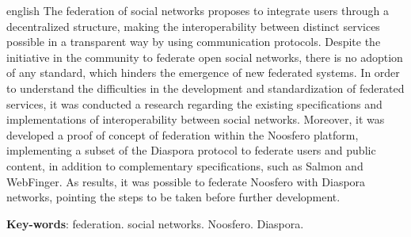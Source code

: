 \begin{resumo}[Abstract]
  \begin{otherlanguage*}{english}
    The federation of social networks proposes to integrate users through a
    decentralized structure, making the interoperability between distinct services
    possible in a transparent way by using communication protocols. Despite the
    initiative in the community to federate open social networks, there is no
    adoption of any standard, which hinders the emergence of new federated systems.
    In order to understand the difficulties in the development and standardization
    of federated services, it was conducted a research regarding the existing
    specifications and implementations of interoperability between social networks.
    Moreover, it was developed a proof of concept of federation within the Noosfero
    platform, implementing a subset of the Diaspora protocol to federate users and
    public content, in addition to complementary specifications, such as Salmon and
    WebFinger. As results, it was possible to federate Noosfero with Diaspora
    networks, pointing the steps to be taken before further development.
    
    \vspace{\onelineskip}
    
    \noindent 
    \textbf{Key-words}: federation. social networks. Noosfero. Diaspora.
  \end{otherlanguage*}
\end{resumo}
